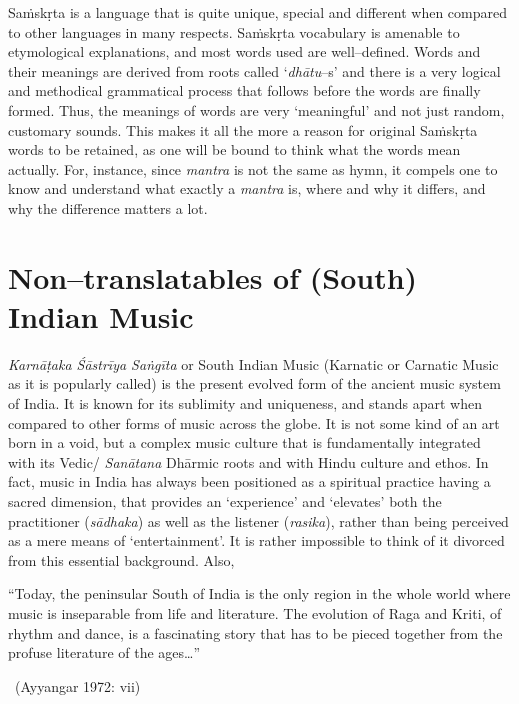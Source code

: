 Saṁskṛta is a language that is quite unique, special and different when compared to other languages in many respects. Saṁskṛta vocabulary is amenable to etymological explanations, and most words used are well–defined. Words and their meanings are derived from roots called ‘\textit{dhātu}–s’ and there is a very logical and methodical grammatical process that follows before the words are finally formed. Thus, the meanings of words are very ‘meaningful’ and not just random, customary sounds. This makes it all the more a reason for original Saṁskṛta words to be retained, as one will be bound to think what the words mean actually. For, instance, since \textit{mantra} is not the same as hymn, it compels one to know and understand what exactly a \textit{mantra} is, where and why it differs, and why the difference matters a lot.

\vspace{-.3cm}

\section*{Non–translatables of (South) Indian Music}

\textit{Karnāṭaka Śāstrīya Saṅgīta} or South Indian Music (Karnatic or Carnatic Music as it is popularly called) is the present evolved form of the ancient music system of India. It is known for its sublimity and uniqueness, and stands apart when compared to other forms of music across the globe. It is not some kind of an art born in a void, but a complex music culture that is fundamentally integrated with its Vedic/ \textit{Sanātana} Dhārmic roots and with Hindu culture and ethos. In fact, music in India has always been positioned as a spiritual practice having a sacred dimension, that provides an ‘experience’ and ‘elevates’ both the practitioner (\textit{sādhaka}) as well as the listener (\textit{rasika}), rather than being perceived as a mere means of ‘entertainment’. It is rather impossible to think of it divorced from this essential background. Also,

\begin{myquote}
“Today, the peninsular South of India is the only region in the whole world where music is inseparable from life and literature. The evolution of Raga and Kriti, of rhythm and dance, is a fascinating story that has to be pieced together from the profuse literature of the ages…” 

~\hfill (Ayyangar 1972: vii)
\end{myquote}

